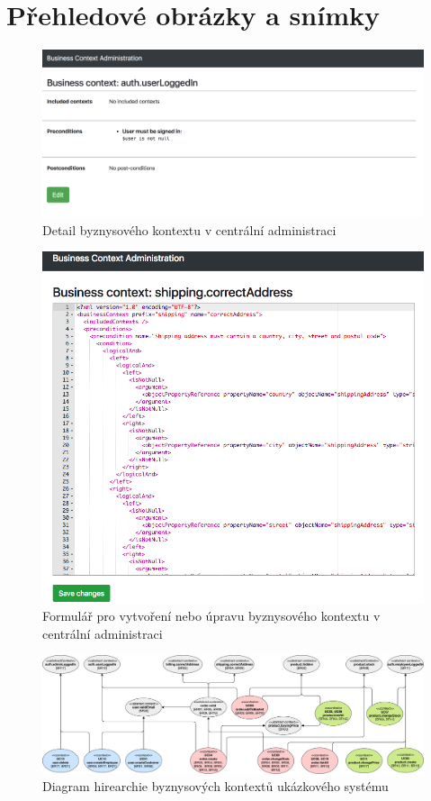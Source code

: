 
\chapter{Přehledové obrázky a snímky}

\begin{figure}[H]
    \centering
    \includegraphics[width=0.9\linewidth]{figures/business-context-detail.png}
    \caption{Detail byznysového kontextu v centrální administraci}
    \label{fig:screenshot-context-detail}
\end{figure}

\begin{figure}[H]
    \centering
    \includegraphics[width=0.9\linewidth]{figures/business-context-edit.png}
    \caption{Formulář pro vytvoření nebo úpravu byznysového kontextu v centrální administraci}
    \label{fig:screenshot-context-edit}
\end{figure}

\begin{figure}
    \centering
    \includegraphics[keepaspectratio=true, width=\linewidth]{figures/example-system-context-hierarchy.pdf}
    \caption{Diagram hirearchie byznysových kontextů ukázkového systému}
    \label{fig:example-system-context-hirearchy}
\end{figure}
